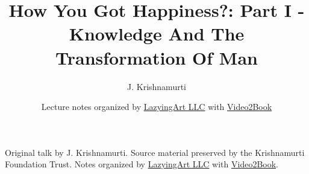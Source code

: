 \documentclass[11pt,oneside]{book}
\begin{document}
\frontmatter
\title{How You Got Happiness?: Part I - Knowledge And The Transformation Of Man}
\author{J. Krishnamurti}
\date{Lecture notes organized by \href{https://lazying.art}{LazyingArt LLC} with \href{https://github.com/lachlanchen/Video2Book}{Video2Book}}
\maketitle
\begin{center}
\small Original talk by J. Krishnamurti. Source material preserved by the Krishnamurti Foundation Trust. Notes organized by \href{https://lazying.art}{LazyingArt LLC} with \href{https://github.com/lachlanchen/Video2Book}{Video2Book}.
\end{center}
\clearpage
\mainmatter

\end{document}
